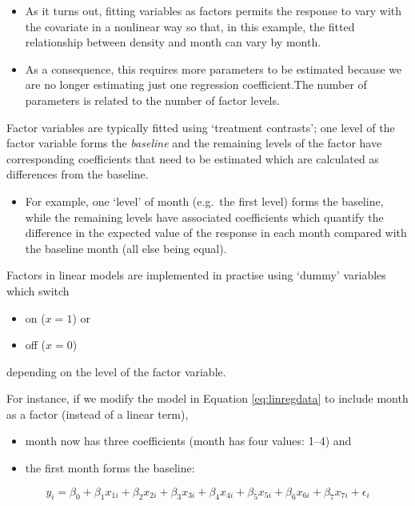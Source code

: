 \documentclass[
  oneside]{krantz}
\providecommand{\tightlist}{%
  \setlength{\itemsep}{0pt}\setlength{\parskip}{0pt}}
\begin{document}
\begin{itemize}
\tightlist
\item
  As it turns out, fitting variables as factors permits the response to vary with the covariate in a nonlinear way so that, in this example, the fitted relationship between density and month can vary by month.\\
\item
  As a consequence, this requires more parameters to be estimated because we are no longer estimating just one regression coefficient.The number of parameters is related to the number of factor levels.
\end{itemize}

Factor variables are typically fitted using `treatment contrasts'; one level of the factor variable forms the \emph{baseline} and the remaining levels of the factor have corresponding coefficients that need to be estimated which are calculated as differences from the baseline.

\begin{itemize}
\tightlist
\item
  For example, one `level' of month (e.g.~the first level) forms the baseline, while the remaining levels have associated coefficients which quantify the difference in the expected value of the response in each month compared with the baseline month (all else being equal).
\end{itemize}

Factors in linear models are implemented in practise using `dummy' variables which switch

\begin{itemize}
\tightlist
\item
  on (\(x=1\)) or
\item
  off (\(x=0\))
\end{itemize}

depending on the level of the factor variable.

For instance, if we modify the model in Equation \eqref{eq:linregdata} to include month as a factor (instead of a linear term),

\begin{itemize}
\tightlist
\item
  month now has three coefficients (month has four values: 1--4) and
\item
  the first month forms the baseline:
\end{itemize}

\begin{equation}
y_{i} =  \beta_0 +
\beta_1x_{1i} + \beta_2x_{2i} +\beta_3x_{3i} +\beta_4x_{4i}+\beta_5x_{5i}+\beta_6x_{6i}+\beta_7x_{7i}+\epsilon_{i}
\label{eq:linregdata2}
\end{equation}
\end{document}
